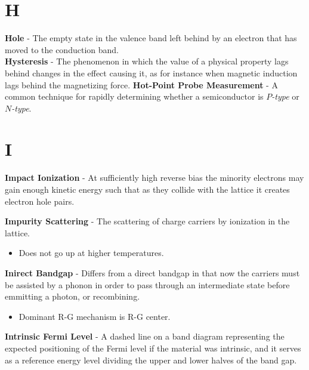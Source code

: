 \section{H}
    \textbf{Hole} - The empty state in the valence band left behind by an electron that has moved to the conduction band.\\
    \vspace{0.15cm}
    \textbf{Hysteresis} - The phenomenon in which the value of a physical property lags behind changes in the effect causing it, as for instance when magnetic induction lags behind the magnetizing force.
\vspace{0.5cm}
\noindent
    \textbf{Hot-Point Probe Measurement} - A common technique for rapidly determining whether a semiconductor is $P$\emph{-type} or $N$\emph{-type}.
\section{I}
    \textbf{Impact Ionization} - At sufficiently high reverse bias the minority electrons may gain enough kinetic energy such that as they collide with the lattice it creates electron hole pairs.

\vspace{0.5cm}
\noindent
    \textbf{Impurity Scattering} - The scattering of charge carriers by ionization in the lattice.
    \vspace{0.15cm}
    \begin{itemize}
        \setlength\itemsep{0.5em}
        \item{Does not go up at higher temperatures.}
    \end{itemize}
\vspace{0.5cm}
    \textbf{Inirect Bandgap} - Differs from a direct bandgap in that now the carriers must be assisted by a phonon in order to pass through an intermediate state before emmitting a photon, or recombining.
    \begin{itemize}
        \setlength\itemsep{0.5em}
        \item{Dominant R-G mechanism is R-G center.}
    \end{itemize}
\vspace{0.5cm}
    \textbf{Intrinsic Fermi Level} - A dashed line on a band diagram representing the expected positioning of the Fermi level if the material was intrinsic, and it serves as a reference energy level dividing the upper and lower halves of the band gap.

